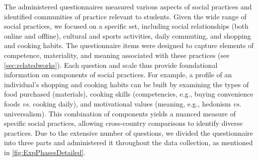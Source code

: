 The administered questionnaires measured various aspects of social practices and identified communities of practice relevant to students. Given the wide range of social practices, we focused on a specific set, including social relationships (both online and offline), cultural and sports activities, daily commuting, and shopping and cooking habits. The questionnaire items were designed to capture elements of competence, materiality, and meaning associated with these practices (see \cref{sec:relatedworks}). Each question and scale thus provide foundational information on components of social practices. For example, a profile of an individual's shopping and cooking habits can be built by examining the types of food purchased (materials), cooking skills (competencies, e.g., buying convenience foods \textit{vs.} cooking daily), and motivational values (meaning, e.g., hedonism \textit{vs.} universalism). This combination of components yields a nuanced measure of specific social practices, allowing cross-country comparisons to identify diverse practices. Due to the extensive number of questions, we divided the questionnaire into three parts and administered it throughout the data collection, as mentioned in \cref{fig:ExpPhasesDetailed}.

